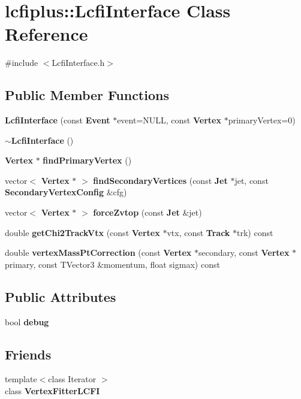 \section{lcfiplus\-:\-:Lcfi\-Interface Class Reference}
\label{classlcfiplus_1_1LcfiInterface}


{\ttfamily \#include $<$Lcfi\-Interface.\-h$>$}

\subsection*{Public Member Functions}
\begin{DoxyCompactItemize}
\item 
{\bf Lcfi\-Interface} (const {\bf Event} $\ast$event=N\-U\-L\-L, const {\bf Vertex} $\ast$primary\-Vertex=0)
\item 
{\bf $\sim$\-Lcfi\-Interface} ()
\item 
{\bf Vertex} $\ast$ {\bf find\-Primary\-Vertex} ()
\item 
vector$<$ {\bf Vertex} $\ast$ $>$ {\bf find\-Secondary\-Vertices} (const {\bf Jet} $\ast$jet, const {\bf Secondary\-Vertex\-Config} \&cfg)
\item 
vector$<$ {\bf Vertex} $\ast$ $>$ {\bf force\-Zvtop} (const {\bf Jet} \&jet)
\item 
double {\bf get\-Chi2\-Track\-Vtx} (const {\bf Vertex} $\ast$vtx, const {\bf Track} $\ast$trk) const 
\item 
double {\bf vertex\-Mass\-Pt\-Correction} (const {\bf Vertex} $\ast$secondary, const {\bf Vertex} $\ast$primary, const T\-Vector3 \&momentum, float sigmax) const 
\end{DoxyCompactItemize}
\subsection*{Public Attributes}
\begin{DoxyCompactItemize}
\item 
bool {\bf debug}
\end{DoxyCompactItemize}
\subsection*{Friends}
\begin{DoxyCompactItemize}
\item 
{\footnotesize template$<$class Iterator $>$ }\\class {\bf Vertex\-Fitter\-L\-C\-F\-I}
\end{DoxyCompactItemize}


